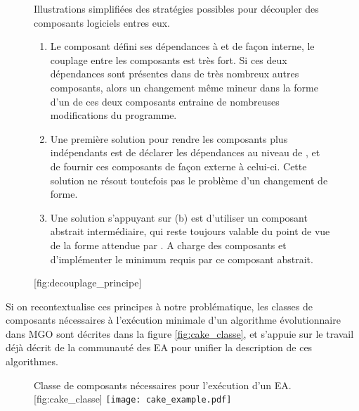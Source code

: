 \begin{figure}[!htbp]
  \begin{sidecaption}[fortoc]{Illustrations simplifiées des stratégies possibles pour découpler des composants logiciels entres eux. \parbox{\marginparwidth}{
	\begin{enumerate}[label=(\alph*),labelindent=\parindent,leftmargin=*]
	        \item Le composant  défini ses dépendances à  et  de façon interne, le couplage entre les composants est très fort. Si ces deux dépendances sont présentes dans de très nombreux autres composants, alors un changement même mineur dans la forme d'un de ces deux composants entraine de nombreuses modifications du programme.
	        \item Une première solution pour rendre les composants plus indépendants est de déclarer les dépendances au niveau de , et de fournir ces composants de façon externe à celui-ci. Cette solution ne résout toutefois pas le problème d'un changement de forme.
	        \item Une solution s'appuyant sur (b) est d'utiliser un composant abstrait intermédiaire, qui reste toujours valable du point de vue de la forme attendue par . A charge des composants  et  d'implémenter le minimum requis par ce composant abstrait.
	\end{enumerate}}}[fig:decouplage_principe]
  \centering
  \qquad
 \end{sidecaption}
\end{figure}

Si on recontextualise ces principes à notre problématique, les classes de composants nécessaires à l'exécution minimale d'un algorithme évolutionnaire dans MGO sont décrites dans la figure \ref{fig:cake_classe}, et s'appuie sur le travail déjà décrit de la communauté des EA pour unifier la description de ces algorithmes.

\begin{figure}[!htbp]
	\begin{sidecaption}[fortoc]{Classe de composants nécessaires pour l'exécution d'un EA.}[fig:cake_classe]
		\centering
		\texttt{[image: cake\_example.pdf]}{
		}
  \end{sidecaption}
\end{figure}


